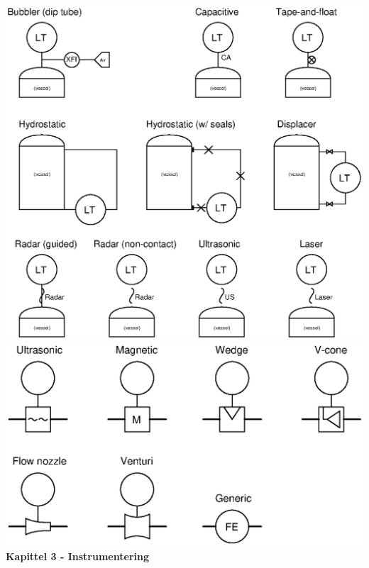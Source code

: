 \documentclass[10pt,a5paper]{article}
\begin{document}
\includegraphics[width=1\textwidth]{diagrams13.eps}
\includegraphics[width=1\textwidth]{diagrams14.eps}
\textbf{Kapittel 3 - Instrumentering}
\end{document}
